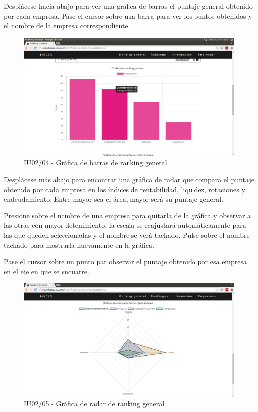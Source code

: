    Desplácese hacia abajo para ver una gráfica de barras el puntaje general obtenido por cada empresa.
    Pase el cursor sobre una barra para ver los puntos obtenidos y el nombre de la empresa correspondiente.

    \begin{figure}[H]
        \begin{center}
            \includegraphics[scale=0.3]{pantallas/Ranking4}
            \caption{IU02/04 - Gráfica de barras de ranking general}
        \end{center}
    \end{figure}

    Desplácese más abajo para encontrar una gráfica de radar que compara el puntaje obtenido
    por cada empresa en los índices de rentabilidad, liquidez, rotaciones y endeudamiento.
    Entre mayor sea el área, mayor será su puntaje general.

    Presione sobre el nombre de una empresa para quitarla de la gráfica y observar a las otras
    con mayor detenimiento, la escala se reajustará automáticamente para las que queden
    seleccionadas y el nombre se verá tachado. Pulse sobre el nombre tachado
    para mostrarla nuevamente en la gráfica.

    Pase el cursor sobre un punto par observar el puntaje obtenido
    por esa empresa en el eje en que se encuatre.


    \begin{figure}[H]
        \begin{center}
            \includegraphics[scale=0.3]{pantallas/Ranking5}
            \caption{IU02/05 - Gráfica de radar de ranking general}
        \end{center}
    \end{figure}
